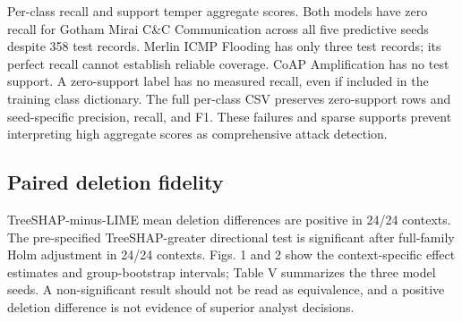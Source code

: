 \documentclass[journal,letterpaper]{IEEEtran}
\begin{document}
Per-class recall and support temper aggregate scores. Both models have zero recall for Gotham Mirai C\&C Communication across all five predictive seeds despite 358 test records. Merlin ICMP Flooding has only three test records; its perfect recall cannot establish reliable coverage. CoAP Amplification has no test support. A zero-support label has no measured recall, even if included in the training class dictionary. The full per-class CSV preserves zero-support rows and seed-specific precision, recall, and F1. These failures and sparse supports prevent interpreting high aggregate scores as comprehensive attack detection.

\subsection{Paired deletion fidelity}
TreeSHAP-minus-LIME mean deletion differences are positive in 24/24 contexts. The pre-specified TreeSHAP-greater directional test is significant after full-family Holm adjustment in 24/24 contexts. Figs. 1 and 2 show the context-specific effect estimates and group-bootstrap intervals; Table V summarizes the three model seeds. A non-significant result should not be read as equivalence, and a positive deletion difference is not evidence of superior analyst decisions.
\end{document}

